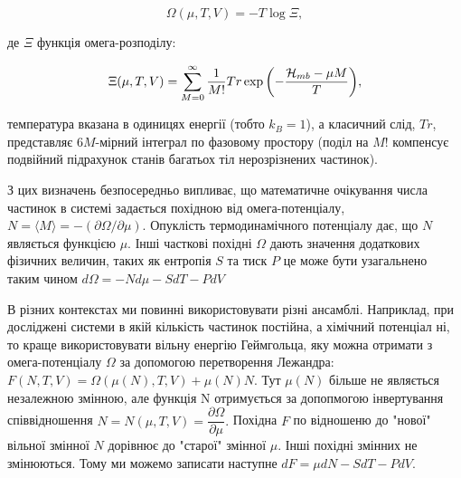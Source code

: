 \begin{equation}
\label{eqn:omegapotential}
	\Omega(\mu,T,V) = -T\log\Xi,
\end{equation}
 
де $\Xi$ функція омега-розподілу:

\begin{equation}
\label{eqn:sgranddistr}
	\Xi(\mu, T, V) = \sum\limits_{M = 0}^\infty\frac{1}{M!}Tr\exp{\left(-\frac{{\cal H}_{mb} - {\mu} M}{T}\right)},
\end{equation}

температура вказана в одиницях енергії (тобто $k_{B} = 1$), а класичний слід, $Tr$, представляє $6M$-мірний інтеграл по фазовому простору (поділ на $M!$ компенсує подвійний підрахунок станів багатьох тіл нерозрізнених частинок). 

З цих визначень безпосередньо випливає, що математичне очікування числа частинок в системі задається похідною від омега-потенціалу, $N = \langle M \rangle = -(\partial{\Omega}/\partial{\mu})$. Опуклість термодинамічного потенціалу \cite{convexfreeenerg} дає, що $N$ являється функцією $\mu$. Інші часткові похідні $\Omega$ дають значення додаткових фізичних величин, таких як ентропія $S$ та тиск $P$ це може бути узагальнено таким чином $d\Omega = -Nd\mu - SdT - PdV$

В різних контекстах ми повинні використовувати різні ансамблі. Наприклад, при досліджені системи в якій кількість частинок постійна, а хімічний потенціал ні, то краще використовувати вільну енергію Геймгольца, яку можна отримати з омега-потенціалу $\Omega$ за допомогою перетворення Лежандра: $F(N,T,V) = \Omega(\mu(N),T,V)+\mu(N)N.$
Тут $\mu(N)$ більше не являється незалежною змінною, але функція N отримується за допопмогою інвертування співвідношення $N = N({\mu},T,V)=\dfrac{\partial\Omega}{\partial\mu}.$ Похідна $F$ по відношеню до "нової" вільної змінної $N$ дорівнює до "старої" змінної $\mu$. Інші похідні змінних не змінюються. Тому ми можемо записати наступне $dF={\mu}dN - SdT - PdV$.

